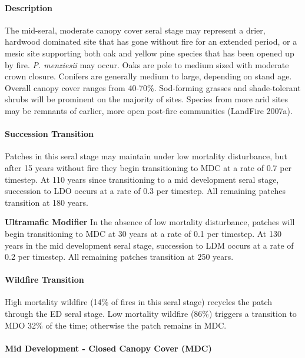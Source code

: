 \paragraph*{Description} The mid-seral, moderate canopy cover seral stage may represent a drier, hardwood dominated site that has gone without fire for an extended period, or a mesic site supporting both oak and yellow pine species that has been opened up by fire. \emph{P. menziesii} may occur. Oaks are pole to medium sized with moderate crown closure. Conifers are generally medium to large, depending on stand age. Overall canopy cover ranges from 40-70\%. Sod-forming grasses and shade-tolerant shrubs will be prominent on the majority of sites. Species from more arid sites may be remnants of earlier, more open post-fire communities (LandFire 2007a).

\paragraph*{Succession Transition} Patches in this seral stage may maintain under low mortality disturbance, but after 15 years without fire they begin transitioning to MDC at a rate of 0.7 per timestep. At 110 years since transitioning to a mid development seral stage, succession to LDO occurs at a rate of 0.3 per timestep. All remaining patches transition at 180 years.
\begin{adjustwidth}{2cm}{}

\medskip
\textbf{Ultramafic Modifier}  In the absence of low mortality disturbance, patches will begin transitioning to MDC at 30 years at a rate of 0.1 per timestep. At 130 years in the mid development seral stage, succession to LDM occurs at a rate of 0.2 per timestep. All remaining patches transition at 250 years.

\end{adjustwidth}
\paragraph*{Wildfire Transition}
High mortality wildfire (14\% of fires in this seral stage) recycles the patch through the ED seral stage. Low mortality wildfire (86\%) triggers a transition to MDO 32\% of the time; otherwise the patch remains in MDC.

\noindent\hrulefill

\paragraph*{Mid Development - Closed Canopy Cover (MDC)}

